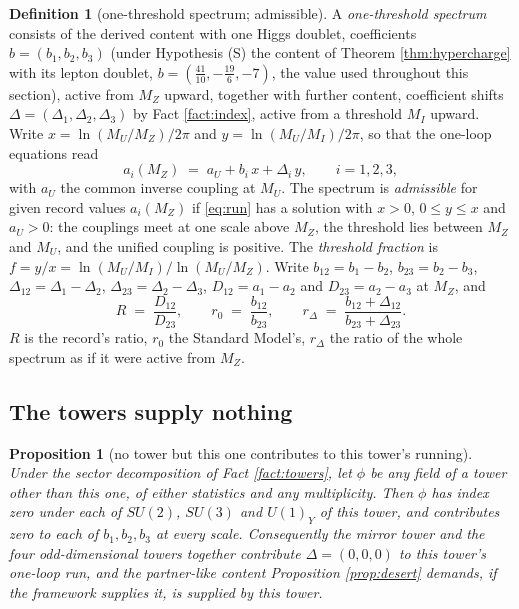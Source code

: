 \documentclass[11pt]{article}
\newtheorem{proposition}[theorem]{Proposition}
\theoremstyle{definition}
\newtheorem{definition}[theorem]{Definition}
\newcommand{\Dl}{\Delta}
\begin{document}
\begin{definition}[one-threshold spectrum; admissible]\label{def:spectrum}
A \emph{one-threshold spectrum} consists of the derived content with one Higgs doublet, coefficients $b = (b_{1}, b_{2}, b_{3})$ (under Hypothesis (S) the content of Theorem \ref{thm:hypercharge} with its lepton doublet, $b = (\tfrac{41}{10}, -\tfrac{19}{6}, -7)$, the value used throughout this section), active from $M_{Z}$ upward, together with further content, coefficient shifts $\Dl = (\Dl_{1}, \Dl_{2}, \Dl_{3})$ by Fact \ref{fact:index}, active from a threshold $M_{I}$ upward. Write $x = \ln(M_{U}/M_{Z})/2\pi$ and $y = \ln(M_{U}/M_{I})/2\pi$, so that the one-loop equations read
\begin{equation}\label{eq:run}
a_{i}(M_{Z}) \;=\; a_{U} + b_{i}\,x + \Dl_{i}\,y, \qquad i = 1, 2, 3,
\end{equation}
with $a_{U}$ the common inverse coupling at $M_{U}$. The spectrum is \emph{admissible} for given record values $a_{i}(M_{Z})$ if \eqref{eq:run} has a solution with $x > 0$, $0 \le y \le x$ and $a_{U} > 0$: the couplings meet at one scale above $M_{Z}$, the threshold lies between $M_{Z}$ and $M_{U}$, and the unified coupling is positive. The \emph{threshold fraction} is $f = y/x = \ln(M_{U}/M_{I})/\ln(M_{U}/M_{Z})$. Write $b_{12} = b_{1} - b_{2}$, $b_{23} = b_{2} - b_{3}$, $\Dl_{12} = \Dl_{1} - \Dl_{2}$, $\Dl_{23} = \Dl_{2} - \Dl_{3}$, $D_{12} = a_{1} - a_{2}$ and $D_{23} = a_{2} - a_{3}$ at $M_{Z}$, and
\[
R \;=\; \frac{D_{12}}{D_{23}}, \qquad r_{0} \;=\; \frac{b_{12}}{b_{23}}, \qquad r_{\Dl} \;=\; \frac{b_{12} + \Dl_{12}}{b_{23} + \Dl_{23}}.
\]
$R$ is the record's ratio, $r_{0}$ the Standard Model's, $r_{\Dl}$ the ratio of the whole spectrum as if it were active from $M_{Z}$.
\end{definition}


\subsection{The towers supply nothing}\label{subsec:towers}

\begin{proposition}[no tower but this one contributes to this tower's running]\label{prop:towers}
Under the sector decomposition of Fact \ref{fact:towers}, let $\phi$ be any field of a tower other than this one, of either statistics and any multiplicity. Then $\phi$ has index zero under each of $SU(2)$, $SU(3)$ and $U(1)_{Y}$ of this tower, and contributes zero to each of $b_{1}, b_{2}, b_{3}$ at every scale. Consequently the mirror tower and the four odd-dimensional towers together contribute $\Dl = (0, 0, 0)$ to this tower's one-loop run, and the partner-like content Proposition \ref{prop:desert} demands, if the framework supplies it, is supplied by this tower.
\end{proposition}
\end{document}
